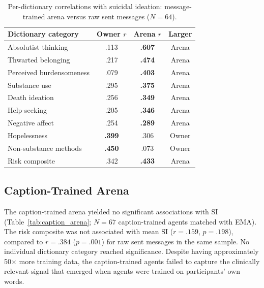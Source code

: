 \documentclass[review,12pt,authoryear]{elsarticle}
\begin{document}
\begin{table}[!htbp]
\centering
\caption{Per-dictionary correlations with suicidal ideation: message-trained arena versus raw sent messages ($N = 64$).}
\label{tab:arena_vs_raw}
\small
\begin{tabular}{lccc}
\toprule
Dictionary category & Owner $r$ & Arena $r$ & Larger \\
\midrule
Absolutist thinking & .113 & \textbf{.607} & Arena \\
Thwarted belonging & .217 & \textbf{.474} & Arena \\
Perceived burdensomeness & .079 & \textbf{.403} & Arena \\
Substance use & .295 & \textbf{.375} & Arena \\
Death ideation & .256 & \textbf{.349} & Arena \\
Help-seeking & .205 & \textbf{.346} & Arena \\
Negative affect & .254 & \textbf{.289} & Arena \\
Hopelessness & \textbf{.399} & .306 & Owner \\
Non-substance methods & \textbf{.450} & .073 & Owner \\
\midrule
Risk composite & .342 & \textbf{.433} & Arena \\
\bottomrule
\end{tabular}
\end{table}

\subsection{Caption-Trained Arena}

The caption-trained arena yielded no significant associations with SI (Table~\ref{tab:caption_arena}; $N = 67$ caption-trained agents matched with EMA). The risk composite was not associated with mean SI ($r = .159$, $p = .198$), compared to $r = .384$ ($p = .001$) for raw sent messages in the same sample. No individual dictionary category reached significance. Despite having approximately 50$\times$ more training data, the caption-trained agents failed to capture the clinically relevant signal that emerged when agents were trained on participants' own words.
\end{document}
